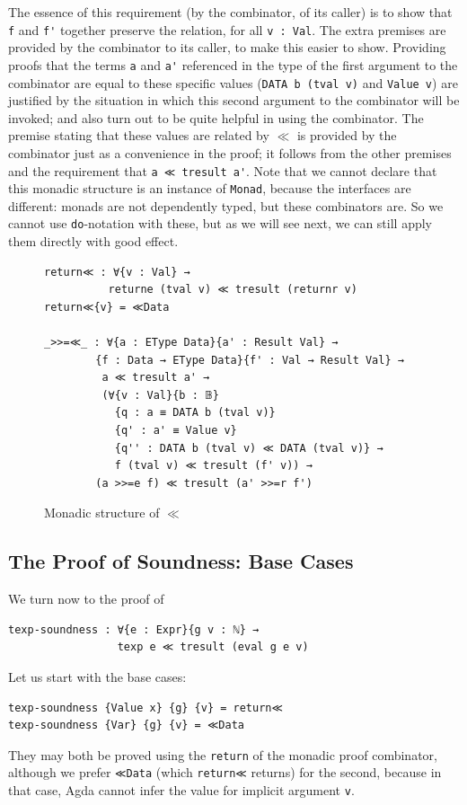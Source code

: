 \documentclass[acmsmall,screen,review]{acmart}
\begin{document}
\noindent The essence of this requirement (by the combinator, of its
caller) is to show that \verb|f| and \verb|f'| together preserve the
relation, for all \verb|v : Val|.  The extra premises are provided by
the combinator to its caller, to make this easier to show.  Providing
proofs that the terms \verb|a| and \verb|a'| referenced in the type of
the first argument to the combinator are equal to these specific
values (\verb|DATA b (tval v)| and \verb|Value v|) are justified by
the situation in which this second argument to the combinator will be
invoked; and also turn out to be quite helpful in using the
combinator.  The premise stating that these values are related by
$\ll$ is provided by the combinator just as a convenience in the
proof; it follows from the other premises and the requirement that
\verb|a ≪ tresult a'|.  Note that we cannot declare that this monadic
structure is an instance of \verb|Monad|, because the interfaces are
different: monads are not dependently typed, but these combinators
are.  So we cannot use \verb|do|-notation with these, but as we will
see next, we can still apply them directly with good effect.

\begin{figure}
\begin{verbatim}  
return≪ : ∀{v : Val} →
          returne (tval v) ≪ tresult (returnr v)
return≪{v} = ≪Data

_>>=≪_ : ∀{a : EType Data}{a' : Result Val} →
        {f : Data → EType Data}{f' : Val → Result Val} → 
         a ≪ tresult a' →
         (∀{v : Val}{b : 𝔹}
           {q : a ≡ DATA b (tval v)}
           {q' : a' ≡ Value v}
           {q'' : DATA b (tval v) ≪ DATA (tval v)} → 
           f (tval v) ≪ tresult (f' v)) → 
        (a >>=e f) ≪ tresult (a' >>=r f')
\end{verbatim}  
\caption{Monadic structure of $\ll$}
\label{fig:llmon}
\end{figure}  

\subsection{The Proof of Soundness: Base Cases}

We turn now to the proof of
\begin{verbatim}
texp-soundness : ∀{e : Expr}{g v : ℕ} →
                 texp e ≪ tresult (eval g e v)
\end{verbatim}
\noindent Let us start with the base cases:
\begin{verbatim}
texp-soundness {Value x} {g} {v} = return≪
texp-soundness {Var} {g} {v} = ≪Data
\end{verbatim}
\noindent They may both be proved using the \verb|return| of the
monadic proof combinator, although we prefer \verb|≪Data| (which
\verb|return≪| returns) for the second, because in that case, Agda
cannot infer the value for implicit argument \verb|v|.
\end{document}
